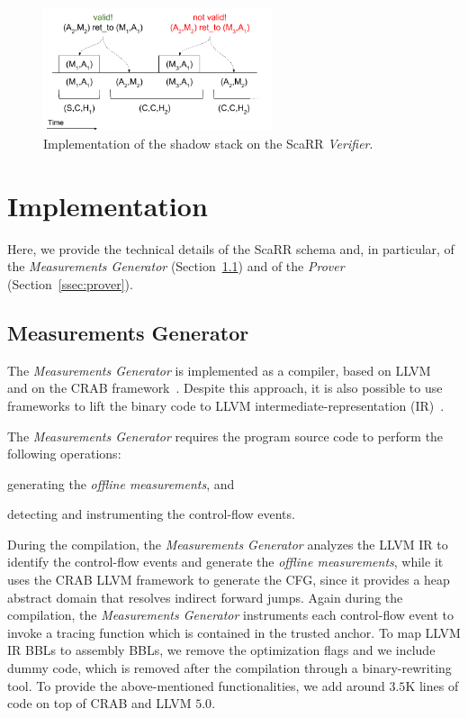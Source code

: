 \begin{figure}[t]
	\centering
	\includegraphics[width=0.6\textwidth]{fig_c4/shadow-stack-no.pdf}
	\caption{Implementation of the shadow stack on the ScaRR \emph{Verifier}.}
	\label{fig:shadow-stack}
\end{figure}

\section{Implementation}
\label{sec:implementation}

Here, we provide the technical details of the ScaRR schema and, in particular, 
of the \emph{Measurements Generator} 
(Section~\ref{ssec:measurements_generator}) and of the \emph{Prover} 
(Section~\ref{ssec:prover}). 

\subsection{Measurements Generator}
\label{ssec:measurements_generator}
The \emph{Measurements Generator} is implemented as a compiler, based on 
LLVM~\cite{lattner2004llvm} and on the CRAB framework~\cite{gange2016abstract}. 
Despite this approach, it is also possible to use frameworks to lift the binary 
code to LLVM intermediate-representation (IR)~\cite{mcsema}.

The \emph{Measurements Generator} requires the program source code to perform 
the following operations:
\begin{enumerate*}[label=(\roman*)]
	\item generating the \emph{offline measurements}, and 
	\item detecting and instrumenting the control-flow events.
\end{enumerate*}
During the compilation, the \emph{Measurements Generator} analyzes the LLVM IR 
to identify the control-flow events and generate the \emph{offline 
measurements}, while it uses the CRAB LLVM framework to generate the CFG, since 
it provides a heap abstract domain that resolves indirect forward jumps.
Again during the compilation, the \emph{Measurements Generator} instruments 
each control-flow event to invoke a tracing function 
which is contained in the trusted anchor.
To map LLVM IR BBLs to assembly BBLs, we remove the optimization flags and we 
include dummy code,
which is removed after the compilation through a binary-rewriting tool.
To provide the above-mentioned functionalities, we add around $3.5$K lines of 
code on top of CRAB and LLVM $5.0$.


